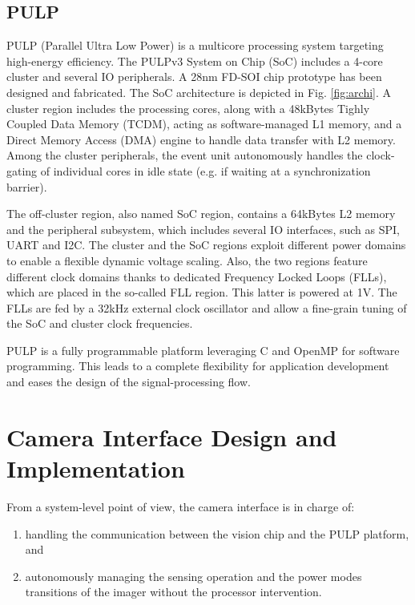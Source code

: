 \documentclass[journal]{IEEEtran}
\begin{document}
\subsection{PULP}
		\label{sec:pulp}	
PULP (Parallel Ultra Low Power) is a multicore processing system targeting high-energy efficiency. 
The PULPv3 System on Chip (SoC) 
\cite{PULP} includes a 4-core cluster and several IO peripherals. A 28nm FD-SOI chip prototype has been designed and fabricated. 
The SoC architecture is depicted in Fig. \ref{fig:archi}. A cluster region includes the processing cores, along with a 48kBytes Tighly Coupled Data Memory (TCDM), acting as software-managed L1 memory, and a Direct Memory Access (DMA) engine to handle data transfer with L2 memory. Among the cluster peripherals, the event unit autonomously handles the clock-gating of individual cores in idle state (e.g. if waiting at a synchronization barrier).

The off-cluster region, also named SoC region, contains a 64kBytes L2 memory and the peripheral subsystem, which includes several IO interfaces, such as SPI, UART and I2C. The cluster and the SoC regions exploit different power domains to enable a flexible dynamic voltage scaling. Also, the two regions feature different clock domains thanks to dedicated Frequency Locked Loops (FLLs), which are placed in the so-called FLL region. This latter is powered at 1V. The FLLs are fed by a 32kHz external clock oscillator and allow a fine-grain tuning of the SoC and cluster clock frequencies. %

PULP is a fully programmable platform leveraging C and OpenMP for software programming. This leads to a complete flexibility for application development and eases the design of the signal-processing flow.







\section{Camera Interface Design and Implementation}
\label{sec:cameraIF}
From a system-level point of view, the camera interface is in charge of:
\begin{enumerate}
\item handling the communication between the vision chip and the PULP platform, and
\item autonomously managing the sensing operation and the power modes transitions of the imager without the processor intervention.
\end{enumerate}
\end{document}
